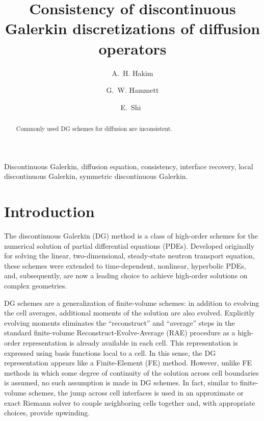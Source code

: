 \documentclass[final]{siamltex}
\title{Consistency of discontinuous Galerkin discretizations of
  diffusion operators}
\author{A.~H. Hakim\footnotemark[2] 
   \and G.~W. Hammett\footnotemark[2]
   \and E.~Shi\footnotemark[2]\ \footnotemark[3]}
\begin{document}
\maketitle

\renewcommand{\thefootnote}{\fnsymbol{footnote}}
%

\begin{abstract}
  Commonly used DG schemes for diffusion are inconsistent.
\end{abstract}

\begin{keywords} 
  Discontinuous Galerkin, diffusion equation, consistency, interface
  recovery, local discontinuous Galerkin, symmetric discontinuous
  Galerkin.
\end{keywords}

\begin{AMS}\end{AMS}

\pagestyle{myheadings}
\thispagestyle{plain}

\section{Introduction}

The discontinuous Galerkin (DG) method is a class of high-order
schemes for the numerical solution of partial differential equations
(PDEs). Developed originally for solving the linear, two-dimensional,
steady-state neutron transport equation\cite{reed-hill-1973}, these
schemes were extended to time-dependent, nonlinear, hyperbolic
PDEs\cite{Cockburn:2001vr}, and, subsequently, are now a leading
choice to achieve high-order solutions on complex geometries.

DG schemes are a generalization of finite-volume schemes: in addition
to evolving the cell averages, additional moments of the solution are
also evolved. Explicitly evolving moments eliminates the
``reconstruct'' and ``average'' steps in the standard finite-volume
Reconstruct-Evolve-Average (RAE) procedure\cite{leveque_book_2002} as
a high-order representation is already available in each cell. This
representation is expressed using basis functions local to a cell. In
this sense, the DG representation appears like a Finite-Element (FE)
method. However, unlike FE methods in which some degree of continuity
of the solution across cell boundaries is assumed, no such assumption
is made in DG schemes. In fact, similar to finite-volume schemes, the
jump across cell interfaces is used in an approximate or exact Riemann
solver to couple neighboring cells together and, with appropriate
choices, provide upwinding.
\end{document}
